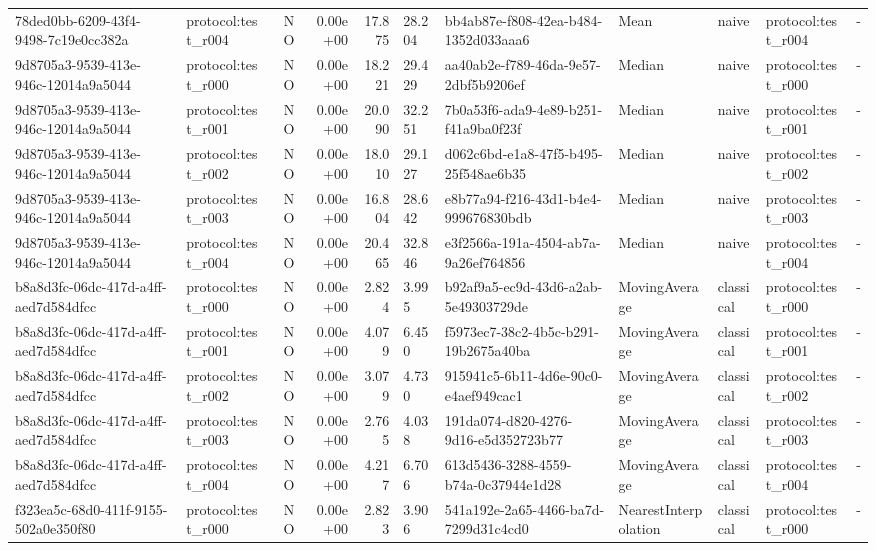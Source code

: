 \begin{table}[htbp]
\begin{tabular}{llrrr}
78ded0bb-6209-43f4-9498-7c19e0cc382a & protocol:test\_r004 & NO & 0.00e+00 & 17.875 & 28.204 & bb4ab87e-f808-42ea-b484-1352d033aaa6 & Mean & naive & protocol:test\_r004 & - \\
9d8705a3-9539-413e-946c-12014a9a5044 & protocol:test\_r000 & NO & 0.00e+00 & 18.221 & 29.429 & aa40ab2e-f789-46da-9e57-2dbf5b9206ef & Median & naive & protocol:test\_r000 & - \\
9d8705a3-9539-413e-946c-12014a9a5044 & protocol:test\_r001 & NO & 0.00e+00 & 20.090 & 32.251 & 7b0a53f6-ada9-4e89-b251-f41a9ba0f23f & Median & naive & protocol:test\_r001 & - \\
9d8705a3-9539-413e-946c-12014a9a5044 & protocol:test\_r002 & NO & 0.00e+00 & 18.010 & 29.127 & d062c6bd-e1a8-47f5-b495-25f548ae6b35 & Median & naive & protocol:test\_r002 & - \\
9d8705a3-9539-413e-946c-12014a9a5044 & protocol:test\_r003 & NO & 0.00e+00 & 16.804 & 28.642 & e8b77a94-f216-43d1-b4e4-999676830bdb & Median & naive & protocol:test\_r003 & - \\
9d8705a3-9539-413e-946c-12014a9a5044 & protocol:test\_r004 & NO & 0.00e+00 & 20.465 & 32.846 & e3f2566a-191a-4504-ab7a-9a26ef764856 & Median & naive & protocol:test\_r004 & - \\
b8a8d3fc-06dc-417d-a4ff-aed7d584dfcc & protocol:test\_r000 & NO & 0.00e+00 & 2.824 & 3.995 & b92af9a5-ec9d-43d6-a2ab-5e49303729de & MovingAverage & classical & protocol:test\_r000 & - \\
b8a8d3fc-06dc-417d-a4ff-aed7d584dfcc & protocol:test\_r001 & NO & 0.00e+00 & 4.079 & 6.450 & f5973ec7-38c2-4b5c-b291-19b2675a40ba & MovingAverage & classical & protocol:test\_r001 & - \\
b8a8d3fc-06dc-417d-a4ff-aed7d584dfcc & protocol:test\_r002 & NO & 0.00e+00 & 3.079 & 4.730 & 915941c5-6b11-4d6e-90c0-e4aef949cac1 & MovingAverage & classical & protocol:test\_r002 & - \\
b8a8d3fc-06dc-417d-a4ff-aed7d584dfcc & protocol:test\_r003 & NO & 0.00e+00 & 2.765 & 4.038 & 191da074-d820-4276-9d16-e5d352723b77 & MovingAverage & classical & protocol:test\_r003 & - \\
b8a8d3fc-06dc-417d-a4ff-aed7d584dfcc & protocol:test\_r004 & NO & 0.00e+00 & 4.217 & 6.706 & 613d5436-3288-4559-b74a-0c37944e1d28 & MovingAverage & classical & protocol:test\_r004 & - \\
f323ea5c-68d0-411f-9155-502a0e350f80 & protocol:test\_r000 & NO & 0.00e+00 & 2.823 & 3.906 & 541a192e-2a65-4466-ba7d-7299d31c4cd0 & NearestInterpolation & classical & protocol:test\_r000 & - \\

\end{tabular}
\end{table}
